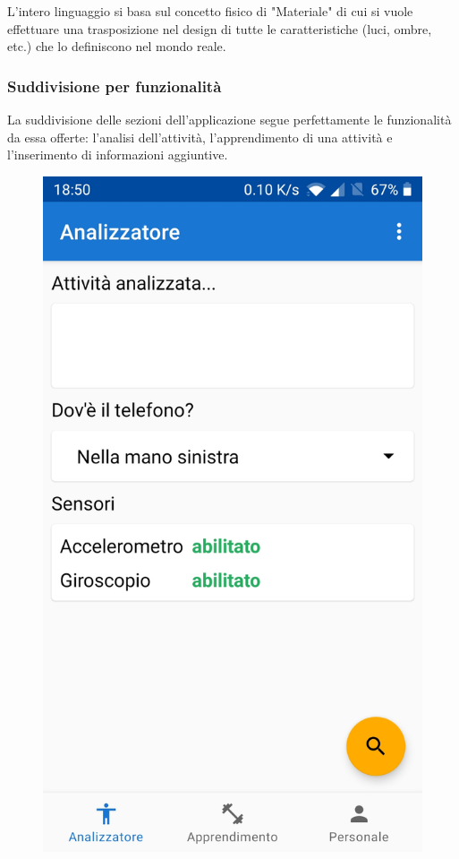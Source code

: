 L'intero linguaggio si basa sul concetto fisico di "Materiale" di cui si vuole effettuare una trasposizione nel 
design di tutte le caratteristiche (luci, ombre, etc.) che lo definiscono nel mondo reale.

\subsubsection{Suddivisione per funzionalità}
La suddivisione delle sezioni dell'applicazione segue perfettamente le funzionalità da essa offerte: 
l'analisi dell'attività, l'apprendimento di una attività e l'inserimento di informazioni aggiuntive.
\begin{figure}[H]
    \centering
    \includegraphics[scale = 0.1019]{assets/images/screenshots/1a_Init.jpg}

\end{figure}
